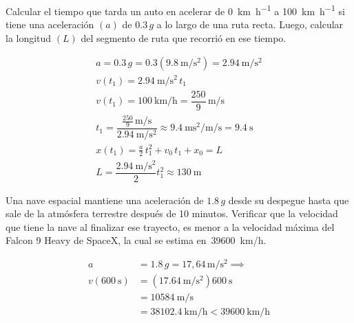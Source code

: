 \begin{mdframed}[style=ExampleFrame]
    \begin{example}
    \end{example}
    \begin{formatI}
        Calcular el tiempo que tarda un auto en acelerar de \SI{0}{\kilo\meter\per\hour} a \SI{100}{\kilo\meter\per\hour} si tiene una aceleración $(a)$ de $\num{0,3}\,g$ a lo largo de una ruta recta.
        Luego, calcular la longitud $(L)$ del segmento de ruta que recorrió en ese tiempo.
    \end{formatI}
    \begin{gather*}
        a = \num{0,3}\,g = \num{0,3} \left( \SI{9,8}{\metre\per\second\squared} \right) = \SI{2,94}{\metre\per\second\squared}
        \\[1ex]
        v(t_1) = \SI{2,94}{\metre\per\second\squared} \, t_1
        \\
        v(t_1) = \SI{100}{\kilo\metre\per\hour}
        = \dfrac{250}{9} \, \si{\metre\per\second}
        \\[1ex]
        t_1 = \dfrac{\frac{250}{9} \, \si{\metre\per\second}}{\SI{2,94}{\metre\per\second\squared}}
        \approx \SI{9,4}{\metre\second\squared\per\metre\per\second}
        = \SI{9,4}{\second}
        \\[1ex]
        x(t_1) =  \frac{a}{2} \, t_1^2 + v_0 \, t_1 + x_0  =  L
        \\
        L =  \dfrac{\SI{2,94}{\metre\per\second\squared}}{2}t_1^2 \approx \SI{130}{\metre}
    \end{gather*}
\end{mdframed}

\begin{mdframed}[style=ExampleFrame]
    \begin{example}
    \end{example}
    \begin{formatI}
        Una nave espacial mantiene una aceleración de $\num{1,8}\,g$ desde su despegue hasta que sale de la atmósfera terrestre después de 10 minutos.
        Verificar que la velocidad que tiene la nave al finalizar ese trayecto, es menor a la velocidad máxima del Falcon 9 Heavy de SpaceX, la cual se estima en~\SI{39600}{\kilo\metre/\hour}.
    \end{formatI}
    \begin{align*}
        a &= \num{1,8}\,g = 17,64 \, \si{\metre\per\second\squared} \implies
        \\
        v \left(\SI{600}{\second}\right) &= \left(\SI{17,64}{\metre\per\second\squared}\right) \SI{600}{\second}
        \\
        &= \SI{10584}{\metre\per\second}
        \\
        &= \SI{38102,4}{\kilo\metre\per\hour} < \SI{39600}{\kilo\metre\per\hour}
    \end{align*}
\end{mdframed}


